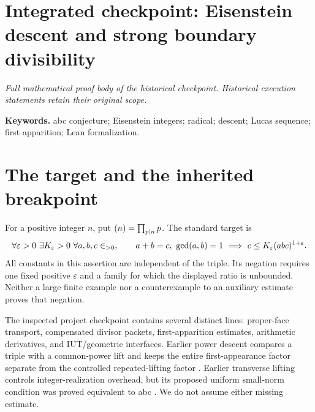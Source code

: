 \clearpage
\begingroup
\let\rad\relax
\newcommand{\rad}{\operatorname{rad}}
\let\ZZ\relax
\newcommand{\ZZ}{\mathbb Z}
\let\QQ\relax
\newcommand{\QQ}{\mathbb Q}
\let\NN\relax
\newcommand{\NN}{\mathbb N}
\let\gcdabs\relax
\newcommand{\gcdabs}[2]{\gcd\!\left(|#1|,|#2|\right)}
\section*{Integrated checkpoint: Eisenstein descent and strong boundary divisibility}
\label{checkpoint:eisenstein}
\noindent\textit{Full mathematical proof body of the historical checkpoint. Historical execution statements retain their original scope.}\medskip



\noindent\textbf{Keywords.} abc conjecture; Eisenstein integers; radical; descent; Lucas sequence; first apparition; Lean formalization.

\section{The target and the inherited breakpoint}
For a positive integer $n$, put $\rad(n)=\prod_{p\mid n}p$. The standard target is
\begin{equation}\label{eisenstein:eq:abc}
\forall\varepsilon>0\ \exists K_\varepsilon>0\ \forall a,b,c\in\ZZ_{>0},\qquad
 a+b=c,\ \gcd(a,b)=1\ \Longrightarrow\ c\le K_\varepsilon\rad(abc)^{1+\varepsilon}.
\end{equation}
All constants in this assertion are independent of the triple. Its negation requires one fixed positive $\varepsilon$ and a family for which the displayed ratio is unbounded. Neither a large finite example nor a counterexample to an auxiliary estimate proves that negation.

The inspected project checkpoint \cite{eisenstein:project} contains several distinct lines: proper-face transport, compensated divisor packets, first-apparition estimates, arithmetic derivatives, and IUT/geometric interfaces. Earlier power descent compares a triple with a common-power lift and keeps the entire first-appearance factor separate from the controlled repeated-lifting factor \cite{eisenstein:power}. Earlier transverse lifting controls integer-realization overhead, but its proposed uniform small-norm condition was proved equivalent to abc \cite{eisenstein:transverse}. We do not assume either missing estimate.

